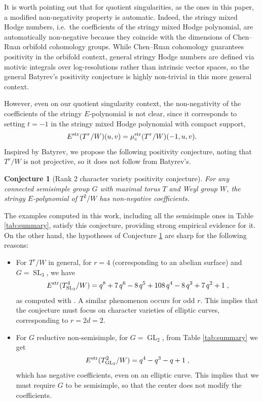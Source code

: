 \documentclass[11pt,english]{amsart}
\numberwithin{equation}{section}
\numberwithin{figure}{section}
\theoremstyle{plain}
\newtheorem{conj}[thm]{Conjecture}
\theoremstyle{plain}
\theoremstyle{definition}
\theoremstyle{remark}
\newcommand{\GL}{\operatorname{GL}}
\newcommand{\SL}{\operatorname{SL}}
\newcommand{\str}{\textup{str}}
\begin{document}
It is worth pointing out that for quotient singularities, as the ones in this paper, a modified non-negativity property is automatic. Indeed, the stringy mixed Hodge numbers, i.e.\ the coefficients of the stringy mixed Hodge polynomial, are automatically non-negative because they coincide with the dimensions of Chen--Ruan orbifold cohomology groups. While Chen--Ruan cohomology guarantees positivity in the orbifold context, general stringy Hodge numbers are defined via motivic integrals over log-resolutions rather than intrinsic vector spaces, so the general Batyrev's positivity conjecture is highly non-trivial in this more general context. 

However, even on our quotient singularity context, the non-negativity of the coefficients of the stringy $E$-polynomial is not clear, since it corresponds to setting $t = -1$ in the stringy mixed Hodge polynomial with compact support,
$$
    E^\str(T^r/W)(u,v) = \mu_c^\str(T^r/W)(-1, u, v).
$$
Inspired by Batyrev, we propose the following positivity conjecture, noting that $T^r/W$ is not projective, so it does not follow from Batyrev's.

\begin{conj}[Rank 2 character variety positivity conjecture]\label{conj:positivity}
    For any connected semisimple group $G$ with maximal torus $T$ and Weyl group $W$, the stringy $E$-polynomial of $T^2/W$ has non-negative coefficients.
\end{conj}


The examples computed in this work, including all the semisimple ones in Table \ref{tab:summary}, satisfy this conjecture, providing strong empirical evidence for it. On the other hand, the hypotheses of Conjecture \ref{conj:positivity} are sharp for the following reasons:
\begin{itemize}
    \item For $T^r/W$ in general, for $r = 4$ (corresponding to an abelian surface) and $G = \SL_3$, we have
$$
    E^\str(T_{\SL_3}^4/W) = q^{8} + 7 \, q^{6} - 8 \, q^{5} + 108 \, q^{4} - 8 \, q^{3} + 7 \, q^{2} + 1\; ,
$$
as computed with \cite{code_repository}. A similar phenomenon occurs for odd $r$. This implies that the conjecture must focus on character varieties of elliptic curves, corresponding to $r = 2d = 2$.
    \item For $G$ reductive non-semisimple, for $G = \GL_2$, from Table \ref{tab:summary} we get
$$
    E^\str(T_{\GL_2}^2/W) = q^{4} - q^{3} - q + 1\; ,
$$
which has negative coefficients, even on an elliptic curve. This implies that we must require $G$ to be semisimple, so that the center does not modify the coefficients.
\end{itemize}
\end{document}

